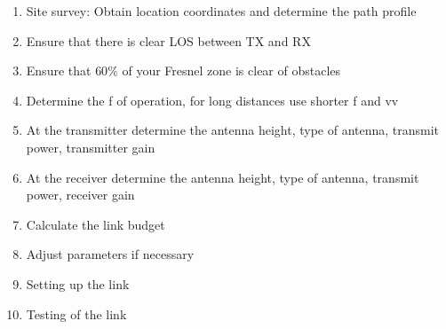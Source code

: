 \documentclass[12pt,a4paper,openright]{report}
\begin{document}
	\begin{enumerate}
		\item Site survey: Obtain location coordinates and determine the path profile
		\item Ensure that there is clear LOS between TX and RX
		\item Ensure that $60\%$ of your Fresnel zone is clear of obstacles
		\item Determine the f of operation, for long distances use shorter f and vv
		\item At the transmitter determine the antenna height, type of antenna, transmit
		power, transmitter gain
		\item At the receiver determine the antenna height, type of antenna, transmit
		power, receiver gain
		\item Calculate the link budget
		\item Adjust parameters if necessary
		\item Setting up the link
		\item Testing of the link
	\end{enumerate}
    
\end{document}
